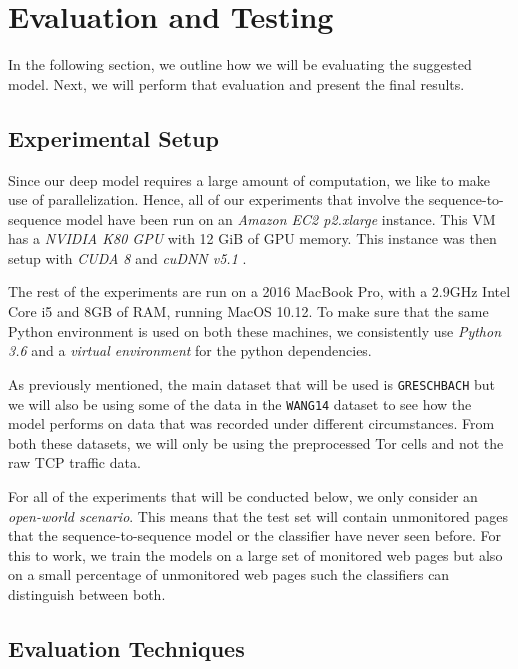 

\chapter{Evaluation and Testing}

In the following section, we outline how we will be evaluating the suggested model.
Next, we will perform that evaluation and present the final results.

\section{Experimental Setup}

Since our deep model requires a large amount of computation, we like to make use of parallelization.
Hence, all of our experiments that involve the sequence-to-sequence model have been run on an \textit{Amazon EC2 p2.xlarge} instance.
This VM has a \textit{NVIDIA K80 GPU} with 12 GiB of GPU memory.
This instance was then setup with \textit{CUDA 8} and \textit{cuDNN v5.1} \cite{tensorflow,nvidia_developer_2017}.

The rest of the experiments are run on a 2016 MacBook Pro, with a 2.9GHz Intel Core i5 and 8GB of RAM, running MacOS 10.12.
To make sure that the same Python environment is used on both these machines, we consistently use \textit{Python 3.6} and a \textit{virtual environment} for the python dependencies.

As previously mentioned, the main dataset that will be used is \texttt{GRESCHBACH} but we will also be using some of the data in the \texttt{WANG14} dataset to see how the model performs on data that was recorded under different circumstances.
From both these datasets, we will only be using the preprocessed Tor cells and not the raw TCP traffic data.

For all of the experiments that will be conducted below, we only consider an \textit{open-world scenario}.
This means that the test set will contain unmonitored pages that the sequence-to-sequence model or the classifier have never seen before.
For this to work, we train the models on a large set of monitored web pages but also on a small percentage of unmonitored web pages such the classifiers can distinguish between both.


\section{Evaluation Techniques}

